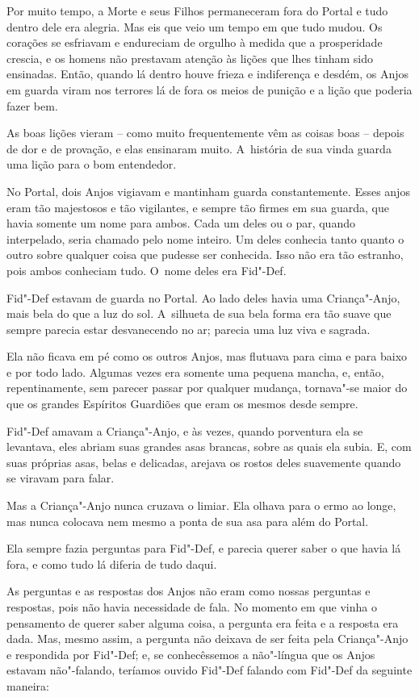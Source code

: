 Por muito tempo, a Morte e seus Filhos permaneceram fora do Portal e
tudo dentro dele era alegria. Mas eis que veio um tempo em que tudo
mudou. Os corações se esfriavam e endureciam de orgulho à medida que a
prosperidade crescia, e os homens não prestavam atenção às lições que
lhes tinham sido ensinadas. Então, quando lá dentro houve frieza e
indiferença e desdém, os Anjos em guarda viram nos terrores lá de fora
os meios de punição e a lição que poderia fazer bem.

As boas lições vieram -- como muito frequentemente vêm as coisas boas --
depois de dor e de provação, e elas ensinaram muito. A~história de sua
vinda guarda uma lição para o bom entendedor.

No Portal, dois Anjos vigiavam e mantinham guarda constantemente. Esses
anjos eram tão majestosos e tão vigilantes, e sempre tão firmes em sua
guarda, que havia somente um nome para ambos. Cada um deles ou o par,
quando interpelado, seria chamado pelo nome inteiro. Um deles conhecia
tanto quanto o outro sobre qualquer coisa que pudesse ser conhecida.
Isso não era tão estranho, pois ambos conheciam tudo. O~nome deles era
Fid"-Def.

Fid"-Def estavam de guarda no Portal. Ao lado deles havia uma
Criança"-Anjo, mais bela do que a luz do sol. A~silhueta de sua bela
forma era tão suave que sempre parecia estar desvanecendo no ar; parecia
uma luz viva e sagrada.

Ela não ficava em pé como os outros Anjos, mas flutuava para cima e para
baixo e por todo lado. Algumas vezes era somente uma pequena mancha, e,
então, repentinamente, sem parecer passar por qualquer mudança,
tornava"-se maior do que os grandes Espíritos Guardiões que eram os
mesmos desde sempre.

Fid"-Def amavam a Criança"-Anjo, e às vezes, quando porventura ela se
levantava, eles abriam suas grandes asas brancas, sobre as quais ela
subia. E, com suas próprias asas, belas e delicadas, arejava os
rostos deles suavemente quando se viravam para falar.

Mas a Criança"-Anjo nunca cruzava o limiar. Ela olhava para o ermo ao
longe, mas nunca colocava nem mesmo a ponta de sua asa para além do
Portal.

Ela sempre fazia perguntas para Fid"-Def, e parecia querer saber o que
havia lá fora, e como tudo lá diferia de tudo daqui.

As perguntas e as respostas dos Anjos não eram como nossas perguntas e
respostas, pois não havia necessidade de fala. No momento em que vinha o
pensamento de querer saber alguma coisa, a pergunta era feita e a
resposta era dada. Mas, mesmo assim, a pergunta não deixava de ser feita
pela Criança"-Anjo e respondida por Fid"-Def; e, se conhecêssemos a
não"-língua que os Anjos estavam não"-falando, teríamos ouvido Fid"-Def
falando com Fid"-Def da seguinte maneira:

